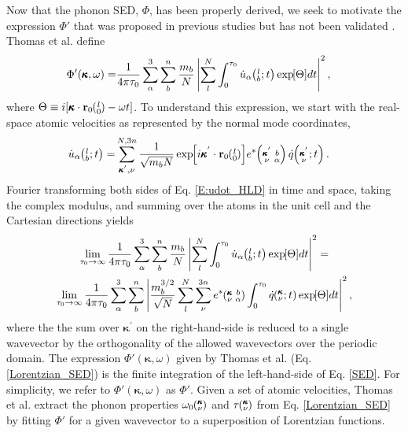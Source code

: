 \documentclass[12pt,twocolumn,iop]{/usr/share/texmf-texlive/tex/latex/iop/iopart}[/usr/share/texmf-texlive/tex/latex/iop/]
\newcommand{\EXP}[1]{\exp\mspace{-5.0mu}\left[#1\right]\mspace{-3.0mu}}
\newcommand{\SUMprime}[2]{\ifthenelse{\equal{#1}{0}}{\sum_{\alpha_{#2},b_{#2},l_{#2}}^{3,n,N}} {\ifthenelse{\equal{#1}{1}}{\sum_{\alpha_{#2},b_{#2}}^{3,n}}{\sum_{\pmb{\kappa}^{'}#2,\nu#2}^{N,3n}}}}
\newcommand{\ab}[2]{\mspace{-4.0mu}\left(\mspace{-8.0mu}\begin{smallmatrix}&\ifthenelse{\equal{#1}{}}{a}{#1} \\&\ifthenelse{\equal{#2}{}}{b}{#2}\end{smallmatrix}\mspace{-3.0mu}\right)}
\newcommand{\kvba}{\mspace{-4.0mu}\left(\mspace{-8.0mu}\begin{smallmatrix} &\pmb{\kappa} &b \\ &\nu &\alpha\end{smallmatrix}\mspace{-3.0mu}\right)}
\newcommand{\kpvba}{\mspace{-4.0mu}\left(\mspace{-8.0mu}\begin{smallmatrix} &\pmb{\kappa}^{'} &b \\ &\nu &\alpha\end{smallmatrix}\mspace{-3.0mu}\right)}
\newcommand{\kvt}{\mspace{-4.0mu}\left(\mspace{-8.0mu}\begin{smallmatrix}&\pmb{\kappa} \\&\nu\end{smallmatrix}\mspace{-2.0mu};t\right)}
\newcommand{\kpvt}{\mspace{-4.0mu}\left(\mspace{-8.0mu}\begin{smallmatrix}&\pmb{\kappa}^{'} \\&\nu\end{smallmatrix}\mspace{-2.0mu};t\right)}
\newcommand{\kv}{\mspace{-4.0mu}\left(\mspace{-8.0mu}\begin{smallmatrix}&\pmb{\kappa} \\&\nu\end{smallmatrix}\mspace{-3.0mu}\right)}
\newcommand{\lbt}{\mspace{-4.0mu}\left(\mspace{-8.0mu}\begin{smallmatrix}&l \\&b\end{smallmatrix}\mspace{-2.0mu};t\right)}
\begin{document}
Now that the phonon SED, $\Phi$, has been properly derived, we seek to motivate the expression $\Phi'$ that was proposed in previous studies but has not been validated \cite{maruyama2003,shiomi2006,thomas2010c}. Thomas et al. \cite{thomas2010c} define
\begin{equation}\label{Lorentzian_SED}
\begin{split}
\Phi'(\pmb{\kappa},\omega) =& \frac{1}{4\pi\tau_0} \sum_\alpha^3 \sum_b^n \frac{m_b}{N}\left| \sum_l^N  \int_{0}^{\tau_0} \dot{u}_{\alpha}\lbt \EXP{\Theta} dt \right|^2,
\end{split}
\end{equation}
where $\Theta \equiv i[\pmb{\kappa}\cdot\mathbf{r}_0\ab{l}{0}-\omega t]$. To understand this expression, we start with the real-space atomic velocities as
represented by the normal mode coordinates,\cite{dove1993}
\begin{equation}\label{E:udot_HLD}
\begin{split}
\dot{u}_{\alpha}\lbt = &\SUMprime{2}{} \frac{1}{\sqrt{m_bN}} \EXP{i\pmb{\kappa}^{'}\cdot\mathbf{r}_0\ab{l}{0}} e^*\kpvba \dot{q}\kpvt{}{}{}.
\end{split}
\end{equation}
Fourier transforming both sides of Eq$.$ \eqref{E:udot_HLD} in time and space, taking the complex modulus, and summing over the atoms in the unit cell and the Cartesian directions yields
\begin{multline}\label{SED}
\lim_{\tau_0\rightarrow\infty}\frac{1}{4\pi\tau_0} \sum_\alpha^3 \sum_b^n \frac{m_b}{N} \left\lvert \sum_l^N  \int_{0}^{\tau_0} \dot{u}_{\alpha}\lbt \EXP{\Theta} dt \right\rvert^2 =
\\ \lim_{\tau_0\rightarrow\infty}\frac{1}{4\pi\tau_0} \sum_\alpha^3 \sum_b^n \left\lvert \frac{m_b^{3/2}}{\sqrt{N}} \sum_l^N \sum_{\nu}^{3n} e^*\kvba \int_{0}^{\tau_0}\dot{q}\kvt\EXP{\Theta}dt \right\rvert^2 ,
\end{multline}
where the the sum over $\pmb{\kappa}^{'}$ on the right-hand-side is reduced to a single wavevector by the orthogonality of the allowed wavevectors over the periodic domain. The expression $\Phi'(\pmb{\kappa},\omega)$ given by Thomas et al. \cite{thomas2010c} (Eq$.$ \eqref{Lorentzian_SED}) is the finite integration of the left-hand-side of Eq$.$ \eqref{SED}. For simplicity, we refer to $\Phi'(\pmb{\kappa},\omega)$ as $\Phi'$. Given a set of atomic velocities, Thomas et al. extract the phonon properties $\omega_0\kv$ and $\tau\kv$ from Eq$.$ \eqref{Lorentzian_SED} by fitting $\Phi'$ for a given wavevector to a superposition of Lorentzian functions.
\end{document}
